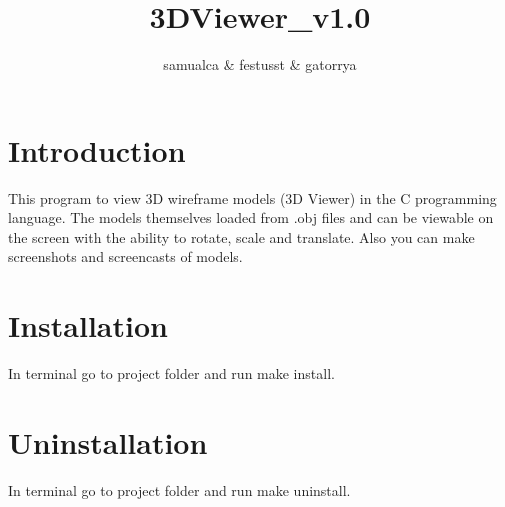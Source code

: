 \documentclass{article}
\title{3DViewer_v1.0}
\author{samualca & festusst & gatorrya}
\begin{document}
\maketitle

\section{Introduction}

This program to view 3D wireframe models (3D Viewer) in the C programming language. The models themselves loaded from .obj files and can be viewable on the screen with the ability to rotate, scale and translate. Also you can make screenshots and screencasts of models.

\section{Installation}

In terminal go to project folder and run make install.

\section{Uninstallation}

In terminal go to project folder and run make uninstall.
\end{document}

